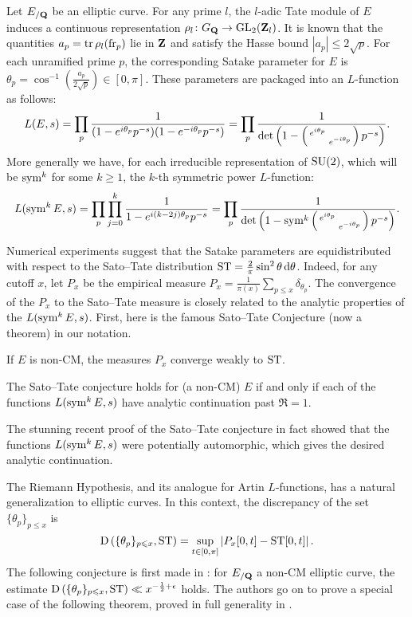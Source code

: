 Let $E_{/\mathbf{Q}}$ be an elliptic curve. For any prime $l$, the $l$-adic Tate 
module of $E$ induces a continuous representation 
$\rho_l \colon G_{\mathbf{Q}} \to \operatorname{GL}_2(\mathbf{Z}_l)$. It is known that the quantities 
$a_p = \operatorname{tr} \rho_l(\mathrm{fr}_p)$ lie in $\mathbf{Z}$ and satisfy the Hasse bound 
$|a_p| \leqslant 2\sqrt p$. For each unramified prime $p$, the 
corresponding Satake parameter for $E$ is 
$\theta_p = \cos^{-1}\left(\frac{a_p}{2\sqrt p}\right) \in [0,\pi]$. 
These parameters are packaged into an $L$-function as follows:
\[
	L(E,s) = \prod_p \frac{1}{(1 - e^{i \theta_p} p^{-s})(1- e^{-i \theta_p} p^{-s})} = \prod_p \frac{1}{\det\left(1 - \left(\begin{smallmatrix} e^{i\theta_p} &  \\  & e^{-i \theta_p} \end{smallmatrix}\right)p^{-s}\right)}.
\]
More generally we have, for each irreducible representation of $\operatorname{SU}(2)$, which 
will be $\operatorname{sym}^k$ for some $k\geqslant 1$, the $k$-th symmetric power 
$L$-function: 
\[
	L(\operatorname{sym}^k E, s) = \prod_p \prod_{j=0}^k \frac{1}{1 - e^{i (k - 2j) \theta_p} p^{-s}} = \prod_p \frac{1}{\det\left(1-\operatorname{sym}^k \left(\begin{smallmatrix} e^{i\theta_p} &  \\  & e^{-i \theta_p} \end{smallmatrix}\right)p^{-s}\right)}.
\]

Numerical experiments suggest that the Satake parameters are equidistributed 
with respect to the Sato--Tate distribution 
$\mathrm{ST} = \frac{2}{\pi} \sin^2\theta\, \mathrm{d}\theta$. Indeed, for any cutoff $x$, let 
$P_x$ be the empirical measure 
$P_x = \frac{1}{\pi(x)} \sum_{p\leqslant x} \delta_{\theta_p}$. 
The convergence of the $P_x$ to the Sato--Tate measure is closely related to 
the analytic properties of the $L(\operatorname{sym}^k E,s)$. First, here is the famous 
Sato--Tate Conjecture (now a theorem) in our notation. 

\begin{theorem}[Taylor et.~al.]
If $E$ is non-CM, the measures $P_x$ converge weakly to $\mathrm{ST}$. 
\end{theorem}

\begin{theorem}[Serre]
The Sato--Tate conjecture holds for (a non-CM) $E$ if and only if each of 
the functions $L(\operatorname{sym}^k E,s)$ have analytic continuation past $\Re = 1$. 
\end{theorem}

The stunning recent proof of the Sato--Tate conjecture 
\cite{clozel-harris-taylor-2008,taylor-2008,harris-shepherd-barron-taylor-2010} 
in fact showed that the functions $L(\operatorname{sym}^k E,s)$ were potentially automorphic, 
which gives the desired analytic continuation. 

The Riemann Hypothesis, and its analogue for Artin $L$-functions, has a natural 
generalization to elliptic curves. In this context, the discrepancy of the set 
$\{\theta_p\}_{p\leqslant x}$ is 
\[
	\operatorname{D}\left(\{\theta_p\}_{p\leqslant x},\mathrm{ST}\right) = \sup_{t\in [0,\pi]} \left| P_x[0,t] - \mathrm{ST}[0,t]\right| .
\]
The following conjecture is first made in \cite{akiyama-tanigawa-1999}: for 
$E_{/\mathbf{Q}}$ a non-CM elliptic curve, the estimate 
$\operatorname{D}\left(\{\theta_p\}_{p\leqslant x},\mathrm{ST}\right)\ll x^{-\frac 1 2+\epsilon}$ 
holds. The authors go on to prove a special case of the following theorem, 
proved in full generality in \cite{mazur-2008}. 

